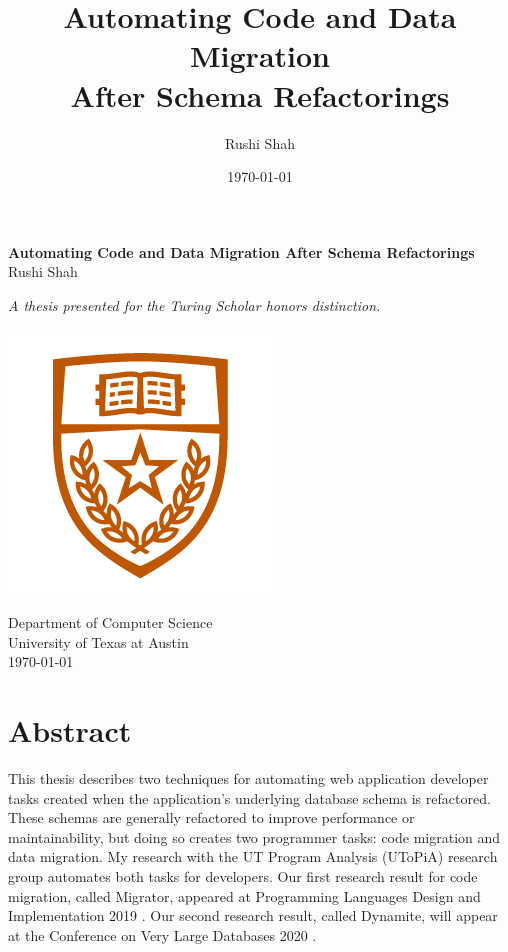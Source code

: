 \documentclass[]{article}
\author{Rushi Shah}
\date{\today}
\title{Automating Code and Data Migration \\ After Schema Refactorings}
\begin{document}
    
\begin{titlepage}
    \begin{center}
        \vspace*{1cm}
            
        \huge
        \textbf{Automating Code and Data Migration After Schema Refactorings \\}
        \vspace{0.5cm}
        \Large
        Rushi Shah


        \vspace{1.5cm}
        \large
        \textit{A thesis presented for the Turing Scholar honors distinction.}
            
            
        \vfill
            
            
            
        \includegraphics[width=.4\textwidth]{texas_shield}

        \vfill
            
        \Large
        Department of Computer Science\\
        University of Texas at Austin\\
        \today
            
    \end{center}
\end{titlepage}

    \maketitle

    \section{Abstract}

        This thesis describes two techniques for automating web application developer tasks created when the application's underlying database schema is refactored. These schemas are generally refactored to improve performance or maintainability, but doing so creates two programmer tasks: code migration and data migration. My research with the UT Program Analysis (UToPiA) research group automates both tasks for developers. Our first research result for code migration, called Migrator, appeared at Programming Languages Design and Implementation 2019 \cite{pldi19}. Our second research result, called Dynamite, will appear at the Conference on Very Large Databases 2020 \cite{vldb20}.
\end{document}
